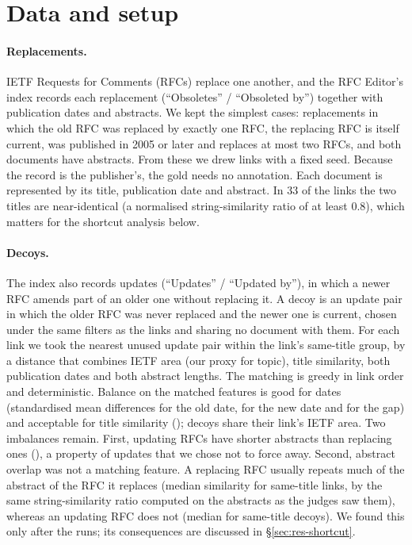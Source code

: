 \section{Data and setup}
\label{sec:studies}
\label{sec:study2}

\paragraph{Replacements.}
IETF Requests for Comments (RFCs) replace one another, and the RFC Editor's index \citep{rfcindex2026} records each
replacement (``Obsoletes'' / ``Obsoleted by'') together with publication dates and abstracts. We kept the simplest
cases: replacements in which the old RFC was replaced by exactly one RFC, the replacing RFC is itself current, was
published in 2005 or later and replaces at most two RFCs, and both documents have abstracts. From these we drew
\ENLinks{} links with a fixed seed. Because the record is the publisher's, the gold needs no annotation. Each document
is represented by its title, publication date and abstract. In 33 of the \ENLinks{} links the two titles are
near-identical (a normalised string-similarity ratio of at least 0.8), which matters for the shortcut analysis below.

\paragraph{Decoys.}
The index also records updates (``Updates'' / ``Updated by''), in which a newer RFC amends part of an older one without
replacing it. A decoy is an update pair in which the older RFC was never replaced and the newer one is current, chosen
under the same filters as the links and sharing no document with them. For each link we took the nearest unused update
pair within the link's same-title group, by a distance that combines IETF area (our proxy for topic), title similarity,
both publication dates and both abstract lengths. The matching is greedy in link order and deterministic. Balance on
the matched features is good for dates (standardised mean differences \EBalOldYearSMD{} for the old date,
\EBalNewYearSMD{} for the new date and \EBalGapYearsSMD{} for the gap) and acceptable for title similarity
(\EBalTitleRatioSMD); \EBalArea{} decoys share their link's IETF area. Two imbalances remain. First, updating RFCs have shorter
abstracts than replacing ones (\EBalNewWordsSMD), a property of updates that we chose not to force away. Second,
abstract overlap was not a matching feature. A replacing RFC usually repeats much of the abstract of the
RFC it replaces (median similarity \EAbsSimLinksSame{} for same-title links, by the same string-similarity ratio
computed on the abstracts as the judges saw them), whereas an updating RFC does not (median
\EAbsSimDecoysSame{} for same-title decoys). We found this only after the runs; its consequences are discussed in
\S\ref{sec:res-shortcut}.

